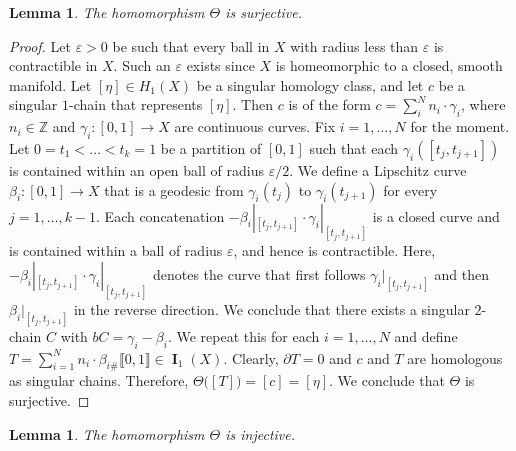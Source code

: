 \documentclass{amsart}
\newtheorem{lemma}[theorem]{Lemma}
\numberwithin{equation}{section}
\newcommand{\Z}{\mathbb{Z}}
\DeclareMathOperator{\bI}{\mathbf{I}}
\newcommand{\bb}[1]{\llbracket #1\rrbracket}
\begin{document}
        \begin{lemma}\label{lemma: codimension-one-homology-surface-surjective}
            The homomorphism $\Theta$ is surjective.
        \end{lemma}

        \begin{proof}
            Let $\varepsilon>0$ be such that every ball in $X$ with radius less than $\varepsilon$ is contractible in $X$. Such an $\varepsilon$ exists since $X$ is homeomorphic to a closed, smooth manifold. Let $[\eta] \in H_1(X)$ be a singular homology class, and let $c$ be a singular $1$-chain that represents $[\eta]$. Then $c$ is of the form $c = \sum_i^N n_i \cdot \gamma_i$, where $n_i \in \Z$ and $\gamma_i\colon [0,1]\to X$ are continuous curves. Fix $i = 1,\dots,N$ for the moment. Let $0=t_1<\dots<t_k= 1$ be a partition of $[0,1]$ such that each $\gamma_i([t_j,t_{j+1}])$ is contained within an open ball of radius $\varepsilon/2$. We define a Lipschitz curve $\beta_i \colon [0,1] \to X$ that is a geodesic from $\gamma_i(t_j)$ to $\gamma_i(t_{j+1})$ for every $j = 1,\dots, k-1$. Each concatenation $-\beta_i|_{[t_j,t_{j+1}]} \cdot \gamma_i|_{[t_j,t_{j+1}]}$ is a closed curve and is contained within a ball of radius $\varepsilon$, and hence is contractible. Here, $-\beta_i|_{[t_j,t_{j+1}]} \cdot \gamma_i|_{[t_j,t_{j+1}]}$ denotes the curve that first follows $\gamma_i|_{[t_j,t_{j+1}]}$ and then $\beta_i|_{[t_j,t_{j+1}]}$ in the reverse direction. We conclude that there exists a singular $2$-chain $C$ with $bC = \gamma_i -\beta_i$. We repeat this for each $i = 1,\dots,N$ and define $T = \sum_{i=1}^N n_i \cdot \beta_{i\#}\bb{0,1}\in \bI_1(X)$. Clearly, $\partial T = 0$ and $c$ and $T$ are homologous as singular chains. Therefore, $\Theta\big([T]\big) = [c] =[\eta]$. We conclude that $\Theta$ is surjective.
        \end{proof}

        \begin{lemma}\label{lemma: codimension-one-homology-surface-injective}
            The homomorphism $\Theta$ is injective.
        \end{lemma}
\end{document}
